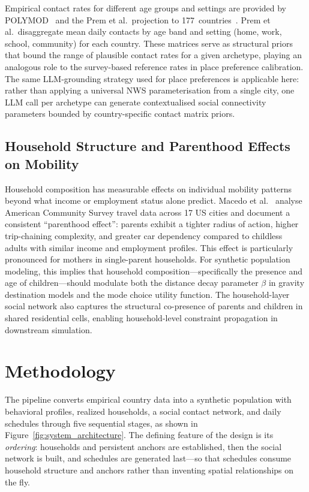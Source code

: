 \documentclass[a4paper,12pt]{article}
\begin{document}
Empirical contact rates for different age groups and settings are provided by
POLYMOD~\cite{mossong2008social} and the Prem et al.\ projection to
177~countries~\cite{prem2021projecting}. Prem et al.\ disaggregate mean daily
contacts by age band and setting (home, work, school, community) for each
country. These matrices serve as structural priors that bound the range of
plausible contact rates for a given archetype, playing an analogous role to
the survey-based reference rates in place preference calibration. The same LLM-grounding
strategy used for place preferences is applicable here: rather than applying
a universal NWS parameterisation from a single city, one LLM call per archetype
can generate contextualised social connectivity parameters bounded by
country-specific contact matrix priors.

\subsection{Household Structure and Parenthood Effects on Mobility}
\label{subsec:related_parenthood}

Household composition has measurable effects on individual mobility patterns
beyond what income or employment status alone predict.
Macedo et al.~\cite{macedo2026parenthood} analyse American Community Survey
travel data across 17 US cities and document a consistent ``parenthood effect'':
parents exhibit a tighter radius of action, higher trip-chaining complexity,
and greater car dependency compared to childless adults with similar income and
employment profiles. This effect is particularly pronounced for mothers in
single-parent households. For synthetic population modeling, this implies that
household composition---specifically the presence and age of children---should
modulate both the distance decay parameter $\beta$ in gravity destination
models and the mode choice utility function. The household-layer social network
also captures the structural co-presence of parents and children in shared
residential cells, enabling household-level constraint propagation in downstream
simulation.

\section{Methodology}
\label{sec:methodology}

The pipeline converts empirical country data into a synthetic population with
behavioral profiles, realized households, a social contact network, and daily
schedules through five sequential stages, as shown in
Figure~\ref{fig:system_architecture}. The defining feature of the design is its
\emph{ordering}: households and persistent anchors are established, then the social
network is built, and schedules are generated last---so that schedules consume
household structure and anchors rather than inventing spatial relationships
on the fly.
\end{document}

